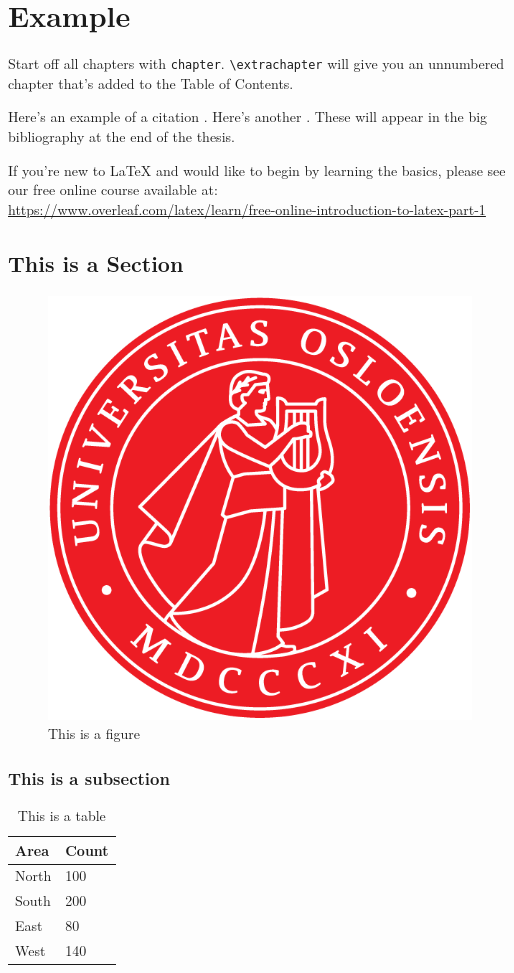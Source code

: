 \chapter{Example}


Start off all chapters with \verb|chapter|.  \verb|\extrachapter| will give you an unnumbered chapter that's added to the Table of Contents. 

Here's an example of a citation \citep{GMP81}. Here's another \citep{PP98}. These will appear in the big bibliography at the end of the thesis.

If you're new to \LaTeX{} and would like to begin by learning the basics, please see our free online course available at:\\ \url{https://www.overleaf.com/latex/learn/free-online-introduction-to-latex-part-1} 


\section{This is a Section}
\lipsum[1-2] \citep{Lin2016a,Berg2006}

\begin{figure}[hbt!]
\centering
\includegraphics[width=.3\textwidth]{uio.png}
\caption{This is a figure}\label{fig:logo}
\end{figure}

\subsection{This is a subsection}

\begin{table}[hbt!]
\centering
\begin{tabular}{ll}
\hline
Area & Count\\
\hline
North & 100\\
South & 200\\
East & 80\\
West & 140\\
\hline
\end{tabular}
\caption{This is a table}
\label{tab:sample}
\end{table}

